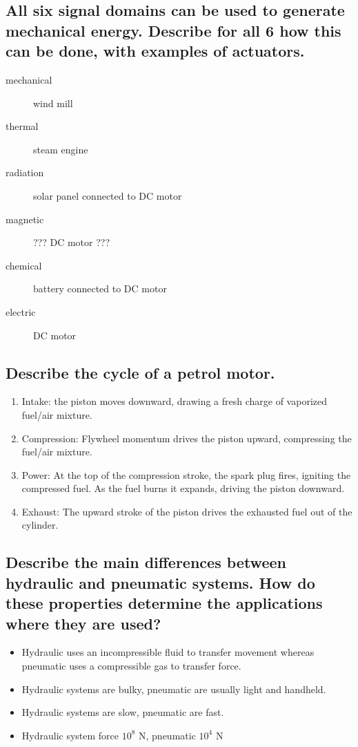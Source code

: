 \documentclass[10pt,a4paper]{article}
\begin{document}
\subsection{All six signal domains can be used to generate mechanical energy. Describe for all 6 how this can be done, with examples of actuators.}

\begin{description}
	\item[mechanical] wind mill
	\item[thermal] steam engine
	\item[radiation] solar panel connected to DC motor
	\item[magnetic] ??? DC motor ???
	\item[chemical] battery connected to DC motor
	\item[electric] DC motor
\end{description}

\subsection{Describe the cycle of a petrol motor.}

\begin{enumerate}
	\item Intake: the piston moves downward, drawing a fresh charge of vaporized fuel/air mixture.
	\item Compression: Flywheel momentum drives the piston upward, compressing the fuel/air mixture.
	\item Power: At the top of the compression stroke, the spark plug fires, igniting the compressed fuel. As the fuel burns it expands, driving the piston downward.
	\item Exhaust: The upward stroke of the piston drives the exhausted fuel out of the cylinder.
\end{enumerate}

\subsection{Describe the main differences between hydraulic and pneumatic systems. How do these properties determine the
applications where they are used?}

\begin{itemize}
	\item Hydraulic uses an incompressible fluid to transfer movement whereas pneumatic uses a compressible gas to transfer force.
	\item Hydraulic systems are bulky, pneumatic are usually light and handheld.
	\item Hydraulic systems are slow, pneumatic are fast.
	\item Hydraulic system force $10^8$ N, pneumatic $10^4$ N
\end{itemize}
\end{document}
